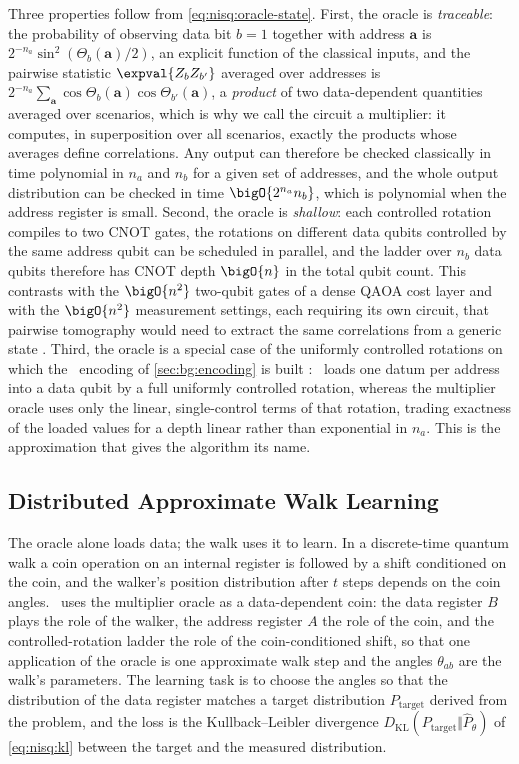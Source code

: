 Three properties follow from \cref{eq:nisq:oracle-state}. First, the oracle is \emph{traceable}: the probability of observing data bit $b=1$ together with address $\bm{a}$ is $2^{-n_{a}}\sin^{2}(\Theta_{b}(\bm{a})/2)$, an explicit function of the classical inputs, and the pairwise statistic $\expval{Z_{b}Z_{b'}}$ averaged over addresses is $2^{-n_{a}}\sum_{\bm{a}}\cos\Theta_{b}(\bm{a})\cos\Theta_{b'}(\bm{a})$, a \emph{product} of two data-dependent quantities averaged over scenarios, which is why we call the circuit a multiplier: it computes, in superposition over all scenarios, exactly the products whose averages define correlations. Any output can therefore be checked classically in time polynomial in $n_{a}$ and $n_{b}$ for a given set of addresses, and the whole output distribution can be checked in time $\bigO{2^{n_{a}}n_{b}}$, which is polynomial when the address register is small. Second, the oracle is \emph{shallow}: each controlled rotation compiles to two CNOT gates, the rotations on different data qubits controlled by the same address qubit can be scheduled in parallel, and the ladder over $n_{b}$ data qubits therefore has CNOT depth $\bigO{n}$ in the total qubit count. This contrasts with the $\bigO{n^{2}}$ two-qubit gates of a dense QAOA cost layer and with the $\bigO{n^{2}}$ measurement settings, each requiring its own circuit, that pairwise tomography would need to extract the same correlations from a generic state \cite{huang2020shadows}. Third, the oracle is a special case of the uniformly controlled rotations \cite{mottonen2004ucr} on which the \qcrank\ encoding of \cref{sec:bg:encoding} is built \cite{balewski2024qcrank}: \qcrank\ loads one datum per address into a data qubit by a full uniformly controlled rotation, whereas the multiplier oracle uses only the linear, single-control terms of that rotation, trading exactness of the loaded values for a depth linear rather than exponential in $n_{a}$. This is the approximation that gives the algorithm its name.

\subsection{Distributed Approximate Walk Learning}\label{sec:nisq:walk}

The oracle alone loads data; the walk uses it to learn. In a discrete-time quantum walk \cite{childs2009quantumwalk} a coin operation on an internal register is followed by a shift conditioned on the coin, and the walker's position distribution after $t$ steps depends on the coin angles. \qawa\ uses the multiplier oracle as a data-dependent coin: the data register $B$ plays the role of the walker, the address register $A$ the role of the coin, and the controlled-rotation ladder the role of the coin-conditioned shift, so that one application of the oracle is one approximate walk step and the angles $\theta_{ab}$ are the walk's parameters. The learning task is to choose the angles so that the distribution of the data register matches a target distribution $P_{\mathrm{target}}$ derived from the problem, and the loss is the Kullback--Leibler divergence $D_{\mathrm{KL}}(P_{\mathrm{target}}\Vert\hat{P}_{\theta})$ of \cref{eq:nisq:kl} between the target and the measured distribution.


